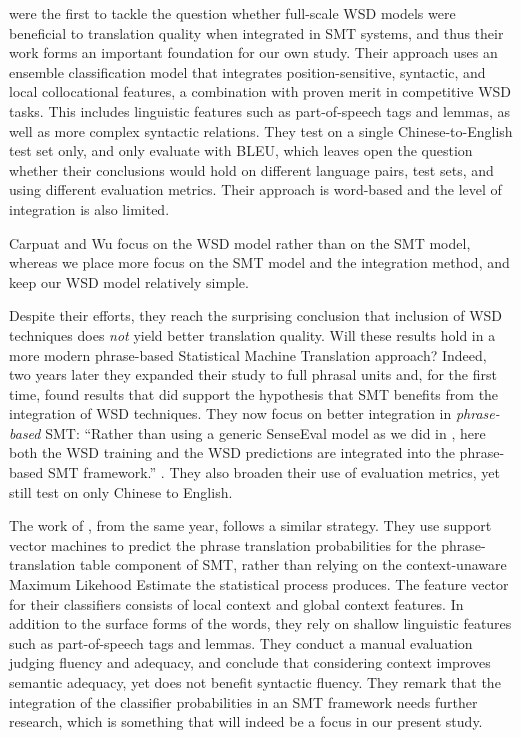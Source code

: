 \cite{CarpuatWu05} were the first to tackle the question whether full-scale WSD
models were beneficial to translation quality when integrated in SMT systems,
and thus their work forms an important foundation for our own study.  Their
approach uses an ensemble classification model that integrates
position-sensitive, syntactic, and local collocational features, a combination
with proven merit in competitive WSD tasks. This includes linguistic features
such as part-of-speech tags and lemmas, as well as more complex syntactic
relations.  They test on a single Chinese-to-English test set only, and only
evaluate with BLEU, which leaves open the question whether their conclusions
would hold on different language pairs, test sets, and using different
evaluation metrics.  Their approach is word-based and the level of
integration is also limited.

Carpuat and Wu focus on the WSD model rather than on the SMT
model, whereas we place more focus on the SMT model and the
integration method, and keep our WSD model relatively
simple.

Despite their efforts, they reach the surprising conclusion that inclusion of
WSD techniques does \emph{not} yield better translation quality. Will these
results hold in a more modern phrase-based Statistical Machine Translation
approach? Indeed, two years later they expanded their study to full phrasal units
\citep{CarpuatWu07} and, for the first time, found results that did support the
hypothesis that SMT benefits from the integration of WSD techniques. They now
focus on better integration in \emph{phrase-based} SMT: ``Rather than using a
generic SenseEval model as we did in \cite{CarpuatWu05}, here both the WSD
training and the WSD predictions are integrated into the phrase-based SMT
framework.'' \citep{CarpuatWu07}. They also broaden their use of evaluation
metrics, yet still test on only Chinese to English.

The work of \cite{Gimenez+07}, from the same year, follows a similar strategy.
They use support vector machines to predict the phrase translation
probabilities for the phrase-translation table component of SMT, rather than
relying on the context-unaware Maximum Likehood Estimate the statistical
process produces. The feature vector for their classifiers consists of local
context and global context features.  In addition to the surface forms of the
words, they rely on shallow linguistic features such as part-of-speech tags and
lemmas. They conduct a manual evaluation judging fluency and adequacy, and
conclude that considering context improves semantic adequacy, yet does not
benefit syntactic fluency. They remark that the integration of the classifier
probabilities in an SMT framework needs further research, which is something
that will indeed be a focus in our present study.

